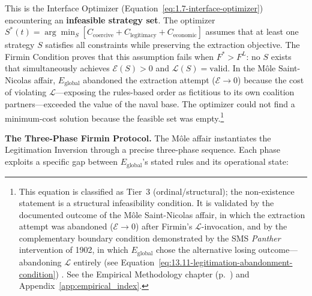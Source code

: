 \begin{definition}
This is the Interface Optimizer (Equation~\ref{eq:1.7-interface-optimizer}) encountering an \textbf{infeasible strategy set}. The optimizer $S^*(t) = \arg\min_S [C_{\text{coercive}} + C_{\text{legitimacy}} + C_{\text{economic}}]$ assumes that at least one strategy $S$ satisfies all constraints while preserving the extraction objective. The Firmin Condition proves that this assumption fails when $F^* > F^L$: no $S$ exists that simultaneously achieves $\mathcal{E}(S) > 0$ and $\mathcal{L}(S) = \text{valid}$. In the M\^{o}le Saint-Nicolas affair, $E_{\text{global}}$ abandoned the extraction attempt ($\mathcal{E} \to 0$) because the cost of violating $\mathcal{L}$---exposing the rules-based order as fictitious to its own coalition partners---exceeded the value of the naval base. The optimizer could not find a minimum-cost solution because the feasible set was empty.\footnote{This equation is classified as Tier~3 (ordinal/structural); the non-existence statement is a structural infeasibility condition. It is validated by the documented outcome of the M\^{o}le Saint-Nicolas affair, in which the extraction attempt was abandoned ($\mathcal{E} \to 0$) after Firmin's $\mathcal{L}$-invocation, and by the complementary boundary condition demonstrated by the SMS \textit{Panther} intervention of 1902, in which $E_{\text{global}}$ chose the alternative losing outcome---abandoning $\mathcal{L}$ entirely (see Equation~\ref{eq:13.11-legitimation-abandonment-condition}) \cite{firmin_legacy, manigat}. See the Empirical Methodology chapter (p.~\pageref{ch:empirical_methodology}) and Appendix~\ref{app:empirical_index}.}
\end{definition}

\textbf{The Three-Phase Firmin Protocol.} The Môle affair instantiates the Legitimation Inversion through a precise three-phase sequence. Each phase exploits a specific gap between $E_{\text{global}}$'s stated rules and its operational state:

